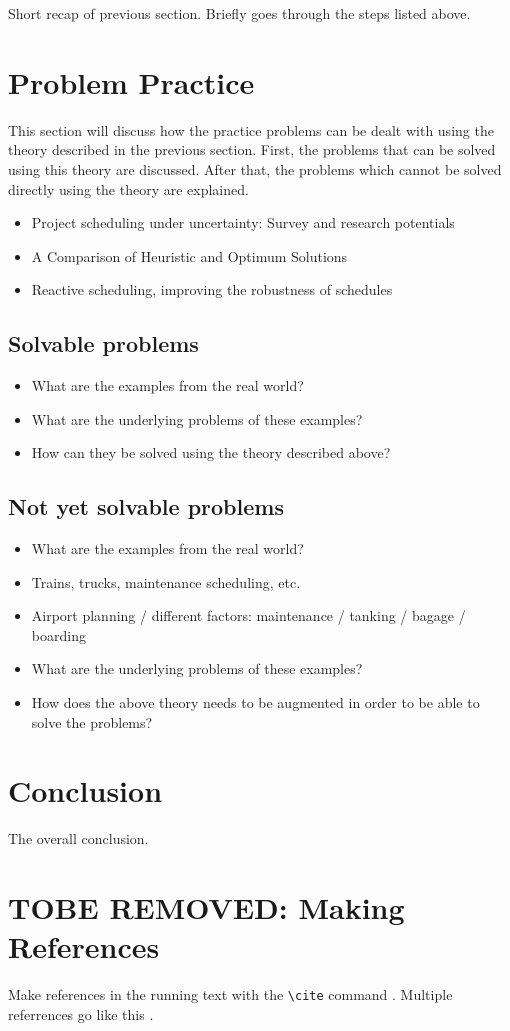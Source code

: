 \documentclass{article}
\begin{document}
Short recap of previous section. Briefly goes through the steps listed above.

\section{Problem Practice}
This section will discuss how the practice problems can be dealt with using the theory described in the previous section. First, the problems that can be solved using this theory are discussed. After that, the problems which cannot be solved directly using the theory are explained.\\

\begin{itemize}
\item Project scheduling under uncertainty: Survey
and research potentials
\item A Comparison of Heuristic and Optimum Solutions
\item Reactive scheduling, improving the robustness of schedules
\end{itemize}

\subsection{Solvable problems}
\begin{itemize}
\item What are the examples from the real world?
\item What are the underlying problems of these examples?
\item How can they be solved using the theory described above?
\end{itemize}

\subsection{Not yet solvable problems}
\begin{itemize}
\item What are the examples from the real world?
\item Trains, trucks, maintenance scheduling, etc.
\item Airport planning / different factors: maintenance / tanking / bagage / boarding
\item What are the underlying problems of these examples?
\item How does the above theory needs to be augmented in order to be able to solve the problems?
\end{itemize}

\section{Conclusion}

The overall conclusion.

\section{TOBE REMOVED: Making References}

  Make references in the running text with the \verb+\cite+
  command \cite{dijkstra68}. Multiple referrences go like this
  \cite{charniak85,steels98}.




\end{document}
